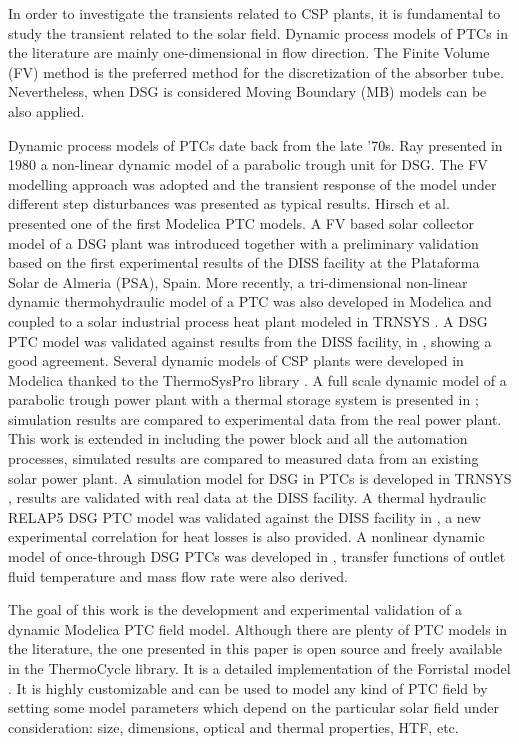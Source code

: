 \documentclass[final,3p,times,review]{elsarticle}
\begin{document}
In order to investigate the transients related to CSP plants, it is fundamental to study the transient related to the solar field. Dynamic process models of PTCs in the literature are mainly one-dimensional in flow direction. The Finite Volume (FV) method is the preferred method for the discretization of the absorber tube. Nevertheless, when DSG is considered Moving Boundary (MB) models can be also applied.

Dynamic process models of PTCs date back from the late ’70s. Ray \cite{Ray1981} presented in 1980 a non-linear dynamic model of a parabolic trough unit for DSG. The FV modelling approach was adopted and the transient response of the model under different step disturbances was presented as typical results. Hirsch et al. \cite{Hirsch2005,Eck2007} presented one of the first Modelica PTC models.  A FV based solar collector model of a DSG plant was introduced together with a preliminary validation based on the first experimental results of the DISS facility at the Plataforma Solar de Almeria (PSA), Spain. More recently, a tri-dimensional non-linear dynamic thermohydraulic model of a PTC was also developed in Modelica and coupled to a solar industrial process heat plant modeled in TRNSYS \citep{Silva2013}. A DSG PTC model was validated against results from the DISS facility, in \cite{Lobon2014}, showing a good agreement. Several dynamic models of CSP plants were developed in Modelica thanked to the ThermoSysPro library \citep{Hefni2014}.  A full scale dynamic model of a parabolic trough power plant with a thermal storage system is presented in \cite{Almaliki2016_1}; simulation results are compared to experimental data from the real power plant. This work is extended in \cite{Almaliki2016_2} including the power block and all the automation processes, simulated results are compared to measured data from an existing solar power plant. A simulation model for DSG in PTCs is developed in TRNSYS \cite{Biencinto2016}, results are validated with real data at the DISS facility. A thermal hydraulic RELAP5 DSG PTC model was validated against the DISS facility in \cite{Serrano2017}, a new experimental correlation for heat losses is also provided. A nonlinear dynamic model of once-through DSG PTCs was developed in \citep{Guo2017}, transfer functions of outlet fluid temperature and mass flow rate were also derived.

The goal of this work is the development and experimental validation of a dynamic Modelica PTC field model. Although there are plenty of PTC models in the literature, the one presented in this paper is open source and freely available in the ThermoCycle library. It is a detailed implementation of the Forristal model \citep{Forristal2003}. It is highly customizable and can be used to model any kind of PTC field by setting some model parameters which depend on the particular solar field under consideration: size, dimensions, optical and thermal properties, HTF, etc.
\end{document}
